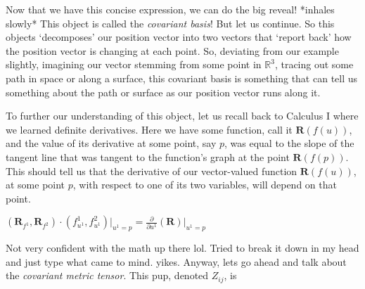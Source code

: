 \documentclass[12pt, a4paper]{article}
\begin{document}
\begin{flushleft}

    Now that we have this concise expression, we can do the big reveal! *inhales slowly* This object is called the \textit{covariant basis}! But let us continue. So this objects `decomposes' our position vector into two vectors that `report back' how the position vector is changing at each point. So, deviating from our example slightly, imagining our vector stemming from some point in $\mathbb{R}^3$, tracing out some path in space or along a surface, this covariant basis is something that can tell us something about the path or surface as our position vector runs along it.
        
\newpage

    To further our understanding of this object, let us recall back to Calculus I where we learned definite derivatives. Here we have some function, call it $\mathbf{R}(f(u))$, and the value of its derivative at some point, say $p$, was equal to the slope of the tangent line that was tangent to the function's graph at the point $\mathbf{R}(f(p))$. This should tell us that the derivative of our vector-valued function $\mathbf{R}(f(u))$, at some point $p$, with respect to one of its two variables, will depend on that point.\par
    
\vspace{6mm}

        \centerline{$(\mathbf{R}_{f^1},\mathbf{R}_{f^2})\cdot(f^1_{u^1},f^2_{u^1})\big|_{u^1=p}=\frac{\partial}{\partial u^1}(\mathbf{R})\big|_{u^1=p}$}
        
\vspace{6mm}

    Not very confident with the math up there lol. Tried to break it down in my head and just type what came to mind. yikes. Anyway, lets go ahead and talk about the \textit{covariant metric tensor}. This pup, denoted $Z_{ij}$, is 

        
        
\end{flushleft}
\end{document}
